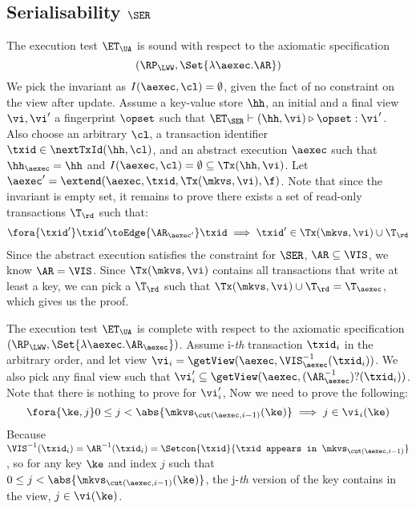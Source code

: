 \subsection{Serialisability \( \SER \)}
\label{sec:sound-complete-ser}

The execution test $\ET_\UA$ is sound with respect to the axiomatic specification 
\[ 
    (\RP_{\LWW}, \Set{\lambda \aexec. \AR })
\]
We pick the invariant as \( I( \aexec, \cl ) = \emptyset \), given the fact of no constraint on the view after update.
Assume a key-value store $\hh$, an initial and a final view $\vi, \vi'$  a fingerprint $\opset$ 
such that $\ET_{\SER} \vdash (\hh, \vi) \triangleright \opset: \vi'$. 
Also choose an arbitrary $\cl$, a transaction identifier $\txid \in \nextTxId(\hh, \cl)$, 
and an abstract execution $\aexec$ such that $\hh_{\aexec} = \hh$ and 
\( I(\aexec, \cl) =  \emptyset \subseteq \Tx(\hh, \vi) \).
Let \( \aexec' = \extend(\aexec, \txid, \Tx(\mkvs, \vi), \f ) \).
Note that since the invariant is empty set, it remains to prove there exists a set of read-only transactions \( \T_\rd \) such that:
\[
    \begin{array}{@{}l@{}}
        \fora{ \txid' } 
        \txid' \toEdge{\AR_{\aexec'}} \txid \implies \txid' \in \Tx(\mkvs, \vi) \cup \T_\rd
    \end{array}
\]
Since the abstract execution satisfies the constraint for \( \SER \), \ie \( \AR \subseteq \VIS \), we know \( \AR = \VIS \).
Since \( \Tx(\mkvs, \vi)  \) contains all transactions that write at least a key, 
we can pick a \( \T_\rd \) such that \( \Tx(\mkvs, \vi) \cup \T_\rd = \T_\aexec\),
which gives us the proof.


The execution test $\ET_\UA$ is complete with respect to the axiomatic specification \( (\RP_{\LWW}, \Set{\lambda \aexec. \AR_\aexec }) \).
Assume i-\emph{th} transaction \( \txid_i \) in the arbitrary order,
and let view \( \vi_{i} = \getView(\aexec, \VIS^{-1}_{\aexec}(\txid_{i}) ) \).
We also pick any final view such that \( \vi'_{i} \subseteq \getView(\aexec, (\AR^{-1}_{\aexec})?(\txid_{i}) ) \).
Note that there is nothing to prove for \( \vi'_i \),
Now we need to prove the following:
\[
    \fora{\ke, j}  0 \leq j < \abs{\mkvs_{\cut(\aexec, i-1)}(\ke)} \implies j \in \vi_i(\ke)
\]
Because \( \VIS^{-1}(\txid_i) = \AR^{-1}(\txid_i) = \Setcon{\txid }{\txid \texttt{ appears in } \mkvs_{\cut(\aexec, i-1)} }\),
so for any key \( \ke \) and index \( j \) such that \( 0 \leq j < \abs{\mkvs_{\cut(\aexec, i-1)}(\ke)} \),
the j-\emph{th} version of the key contains in the view, \ie \( j \in \vi(\ke)\).

